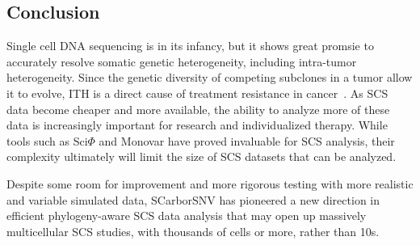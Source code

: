 \documentclass[../main.tex]{subfiles}
\begin{document}
\subsection{Conclusion}
Single cell DNA sequencing is in its infancy, but it shows great promsie to accurately resolve somatic genetic heterogeneity, including intra-tumor heterogeneity.
Since the genetic diversity of competing subclones in a tumor allow it to evolve, ITH is a direct cause of treatment resistance in cancer~\cite{metastatic, merlo2006cancer, greaves2012clonal}.
As SCS data become cheaper and more available, the ability to analyze more of these data is increasingly important for research and individualized therapy.
While tools such as Sci$\Phi$ and Monovar have proved invaluable for SCS analysis, their complexity ultimately will limit the size of SCS datasets that can be analyzed.

Despite some room for improvement and more rigorous testing with more realistic and variable simulated data, SCarborSNV has pioneered a new direction in efficient phylogeny-aware SCS data analysis that may open up massively multicellular SCS studies, with thousands of cells or more, rather than 10s.
\end{document}
